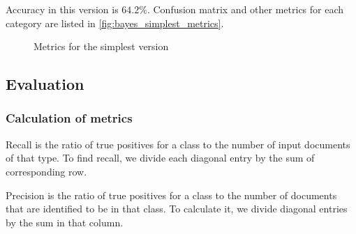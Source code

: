 Accuracy in this version is $64.2\%$. Confusion matrix and other metrics for each category are listed in \autoref{fig:bayes_simplest_metrics}.

\begin{figure}[htpb]
    \caption{Metrics for the simplest version}
    \label{fig:bayes_simplest_metrics}
    \begin{tcolorbox}
        
    \end{tcolorbox}
\end{figure}

\subsection{Evaluation}
\label{sec:bayes_evaluation}

\subsubsection{Calculation of metrics}
Recall is the ratio of true positives for a class to the number of input documents of that type. To find recall, we divide each diagonal entry by the sum of corresponding row.

Precision is the ratio of true positives for a class to the number of documents that are identified to be in that class. To calculate it, we divide diagonal entries by the sum in that column.
